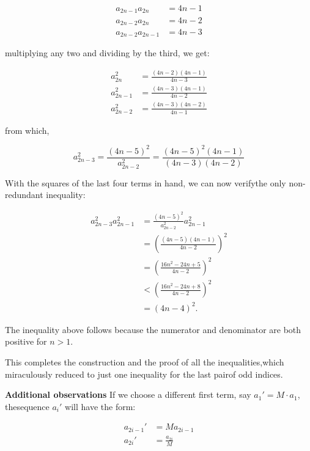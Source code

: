 \begin{enumerate}
 
 \begin{align*}   a_{2n-1}a_{2n} &= 4n-1 \\   a_{2n-2}a_{2n} &= 4n-2 \\   a_{2n-2}a_{2n-1} &= 4n-3 \end{align*}


 

 multiplying any two and dividing by the third, we get:

 
 \begin{align*}   a_{2n}^2     &= \frac{(4n-2)(4n-1)}{4n-3} \\   a_{2n-1}^2  &= \frac{(4n-3)(4n-1)}{4n-2} \\   a_{2n-2}^2  &= \frac{(4n-3)(4n-2)}{4n-1} \end{align*}


 

 from which,

 
 \[a_{2n-3}^2 = \frac{(4n-5)^2}{a_{2n-2}^2} = \frac{(4n-5)^2(4n-1)}{(4n-3)(4n-2)}\]

 

 With the squares of the last four terms in hand, we can now verifythe only non-redundant inequality:

 
 \begin{align*} a_{2n-3}^2a_{2n-1}^2   &= \frac{(4n-5)^2}{a_{2n-2}^2}a_{2n-1}^2 \\   &= \left(\frac{(4n-5)(4n-1)}{4n-2}\right)^2 \\   &= \left(\frac{16n^2 -24n + 5}{4n-2}\right)^2 \\   &< \left(\frac{16n^2 -24n + 8}{4n-2}\right)^2 \\   &= (4n-4)^2. \end{align*}


 

 The inequality above follows because the numerator and denominator are both positive for $n > 1$.

 This completes the construction and the proof of all the inequalities,which miraculously reduced to just one inequality for the last pairof odd indices.

 \textbf{Additional observations} If we choose a different first term, say $a_1' = M\cdot a_1$, thesequence $a_i'$ will have the form:

 
 \begin{align*} 	a_{2i-1}' &= Ma_{2i-1} \\ 	a_{2i}' &= \frac{a_{2i}}{M} \end{align*}



\end{enumerate}

